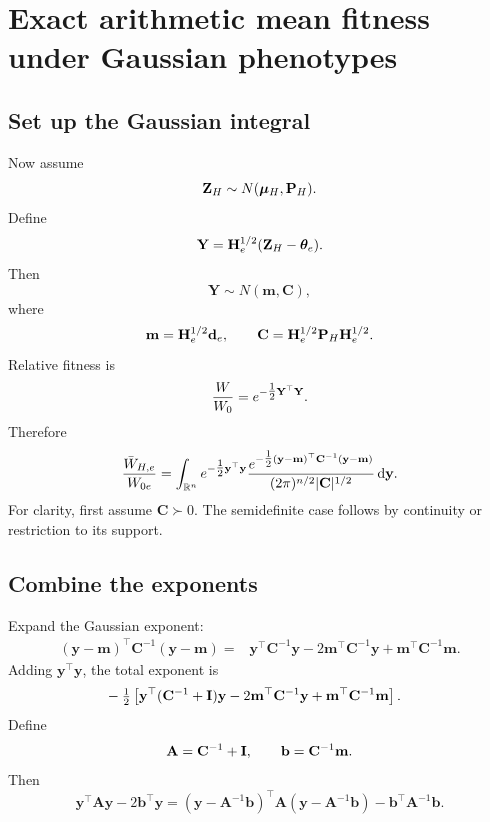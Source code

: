 \chapter{Exact arithmetic mean fitness under Gaussian phenotypes}

\section{Set up the Gaussian integral}

Now assume
\begin{equation}
\mathbf Z_H\sim N(\boldsymbol{\mu}_H,\mathbf{P}_H).
\end{equation}
Define
\begin{equation}
\mathbf Y=\mathbf{H}_e^{1/2}(\mathbf Z_H-\boldsymbol{\theta}_e).
\end{equation}
Then
\begin{equation}
\mathbf Y\sim N(\mathbf m,\mathbf C),
\end{equation}
where
\begin{equation}
\mathbf m=\mathbf{H}_e^{1/2}\mathbf d_e,
\qquad
\mathbf C=\mathbf{H}_e^{1/2}\mathbf{P}_H\mathbf{H}_e^{1/2}.
\end{equation}
Relative fitness is
\begin{equation}
\frac{W}{W_0}=e^{-\tfrac12\mathbf Y^\top\mathbf Y}.
\end{equation}
Therefore
\begin{equation}
\frac{\bar W_{H,e}}{W_{0e}}
=\int_{\mathbb R^n}e^{-\tfrac12\mathbf y^\top\mathbf y}
\frac{e^{-\tfrac12(\mathbf y-\mathbf m)^\top\mathbf C^{-1}(\mathbf y-\mathbf m)}}
{(2\pi)^{n/2}|\mathbf C|^{1/2}}\,\mathrm d\mathbf y.
\label{eq:GaussianFitnessIntegral}
\end{equation}
For clarity, first assume \(\mathbf C\succ0\). The semidefinite case follows by continuity or restriction to its support.

\section{Combine the exponents}

Expand the Gaussian exponent:
\begin{align}
(\mathbf y-\mathbf m)^\top\mathbf C^{-1}(\mathbf y-\mathbf m)
={}&\mathbf y^\top\mathbf C^{-1}\mathbf y
-2\mathbf m^\top\mathbf C^{-1}\mathbf y
+\mathbf m^\top\mathbf C^{-1}\mathbf m.
\end{align}
Adding \(\mathbf y^\top\mathbf y\), the total exponent is
\begin{align}
&-\tfrac12\left[
\mathbf y^\top(\mathbf C^{-1}+\mathbf{I})\mathbf y
-2\mathbf m^\top\mathbf C^{-1}\mathbf y
+\mathbf m^\top\mathbf C^{-1}\mathbf m
\right].
\end{align}
Define
\begin{equation}
\mathbf A=\mathbf C^{-1}+\mathbf{I},
\qquad
\mathbf b=\mathbf C^{-1}\mathbf m.
\end{equation}
Then
\begin{equation}
\mathbf y^\top\mathbf A\mathbf y-2\mathbf b^\top\mathbf y
=(\mathbf y-\mathbf A^{-1}\mathbf b)^\top\mathbf A
(\mathbf y-\mathbf A^{-1}\mathbf b)
-\mathbf b^\top\mathbf A^{-1}\mathbf b.
\label{eq:completeSquareMatrix}
\end{equation}

